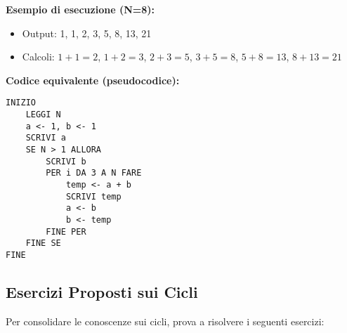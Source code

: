 \documentclass[a4paper,16pt]{article}
\begin{document}
\textbf{Esempio di esecuzione (N=8):}
\begin{itemize}
    \item Output: 1, 1, 2, 3, 5, 8, 13, 21
    \item Calcoli: $1+1=2$, $1+2=3$, $2+3=5$, $3+5=8$, $5+8=13$, $8+13=21$
\end{itemize}

\textbf{Codice equivalente (pseudocodice):}
\begin{lstlisting}
INIZIO
    LEGGI N
    a <- 1, b <- 1
    SCRIVI a
    SE N > 1 ALLORA
        SCRIVI b
        PER i DA 3 A N FARE
            temp <- a + b
            SCRIVI temp
            a <- b
            b <- temp
        FINE PER
    FINE SE
FINE
\end{lstlisting}

\newpage
\subsection{Esercizi Proposti sui Cicli}

Per consolidare le conoscenze sui cicli, prova a risolvere i seguenti esercizi:
\end{document}
